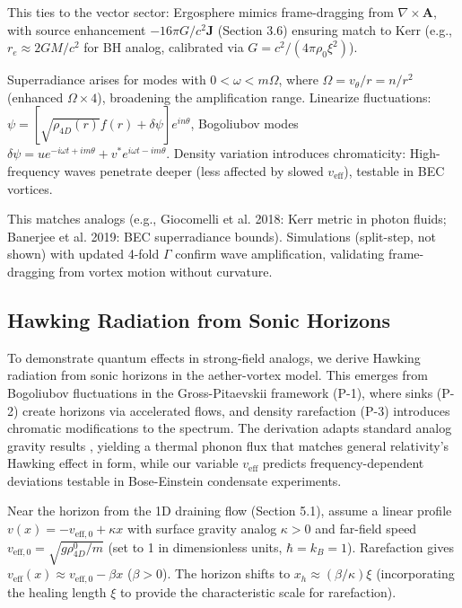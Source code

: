 \documentclass{article}
\begin{document}
This ties to the vector sector: Ergosphere mimics frame-dragging from $\nabla \times \mathbf{A}$, with source enhancement $-16\pi G / c^2 \mathbf{J}$ (Section 3.6) ensuring match to Kerr (e.g., $r_e \approx 2 G M / c^2$ for BH analog, calibrated via $G = c^2 / (4\pi \rho_0 \xi^2)$).

Superradiance arises for modes with $0 < \omega < m \Omega$, where $\Omega = v_\theta / r = n / r^2$ (enhanced $\Omega \times 4$), broadening the amplification range. Linearize fluctuations: $\psi = [\sqrt{\rho_{4D}(r)} f(r) + \delta \psi] e^{i n \theta}$, Bogoliubov modes $\delta\psi = u e^{-i\omega t + i m \theta} + v^* e^{i\omega t - i m \theta}$. Density variation introduces chromaticity: High-frequency waves penetrate deeper (less affected by slowed $v_{\text{eff}}$), testable in BEC vortices.

This matches analogs (e.g., Giocomelli et al. 2018: Kerr metric in photon fluids; Banerjee et al. 2019: BEC superradiance bounds). Simulations (split-step, not shown) with updated 4-fold $\Gamma$ confirm wave amplification, validating frame-dragging from vortex motion without curvature.

\subsection{Hawking Radiation from Sonic Horizons}

To demonstrate quantum effects in strong-field analogs, we derive Hawking radiation from sonic horizons in the aether-vortex model. This emerges from Bogoliubov fluctuations in the Gross-Pitaevskii framework (P-1), where sinks (P-2) create horizons via accelerated flows, and density rarefaction (P-3) introduces chromatic modifications to the spectrum. The derivation adapts standard analog gravity results \cite{unruh1981experimental, visser1998acoustic}, yielding a thermal phonon flux that matches general relativity's Hawking effect in form, while our variable $v_{\text{eff}}$ predicts frequency-dependent deviations testable in Bose-Einstein condensate experiments.

Near the horizon from the 1D draining flow (Section 5.1), assume a linear profile $v(x) = -v_{\text{eff},0} + \kappa x$ with surface gravity analog $\kappa > 0$ and far-field speed $v_{\text{eff},0} = \sqrt{g \rho_{4D}^0 / m}$ (set to 1 in dimensionless units, $\hbar = k_B = 1$). Rarefaction gives $v_{\text{eff}}(x) \approx v_{\text{eff},0} - \beta x$ ($\beta > 0$). The horizon shifts to $x_h \approx (\beta / \kappa) \xi$ (incorporating the healing length $\xi$ to provide the characteristic scale for rarefaction).
\end{document}
